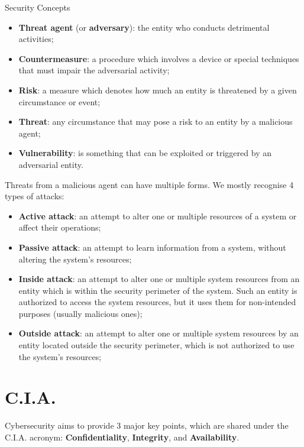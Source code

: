 \begin{definition}{Security Concepts}
    \begin{itemize}
        \item \textbf{Threat agent} (or \textbf{adversary}): the entity who conducts detrimental activities;
        \item \textbf{Countermeasure}: a procedure which involves a device or special techniques that must impair the adversarial activity;
        \item \textbf{Risk}: a measure which denotes how much an entity is threatened by a given circumstance or event;
        \item \textbf{Threat}: any circumstance that may pose a risk to an entity by a malicious agent;
        \item \textbf{Vulnerability}: is something that can be exploited or triggered by an adversarial entity.
    \end{itemize}    
\end{definition}

Threats from a malicious agent can have multiple forms. We mostly recognise 4 types of attacks:
\begin{itemize}
    \item \textbf{Active attack}: an attempt to alter one or multiple resources of a system or affect their operations;
    \item \textbf{Passive attack}: an attempt to learn information from a system, without altering the system's resources;
    \item \textbf{Inside attack}: an attempt to alter one or multiple system resources from an entity which is within the security perimeter of the system. Such an entity is authorized to access the system resources, but it uses them for non-intended purposes (usually malicious ones);
    \item \textbf{Outside attack}: an attempt to alter one or multiple system resources by an entity located outside the security perimeter, which is not authorized to use the system's resources;
\end{itemize}

\section{C.I.A.}

Cybersecurity aims to provide 3 major key points, which are shared under the C.I.A. acronym: \textbf{Confidentiality}, \textbf{Integrity}, and \textbf{Availability}.

